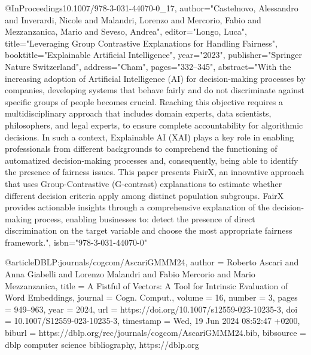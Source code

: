 {@InProceedings{10.1007/978-3-031-44070-0_17,
author="Castelnovo, Alessandro and Inverardi, Nicole and Malandri, Lorenzo and Mercorio, Fabio and Mezzanzanica, Mario and Seveso, Andrea",
editor="Longo, Luca",
title="Leveraging Group Contrastive Explanations for Handling Fairness",
booktitle="Explainable Artificial Intelligence",
year="2023",
publisher="Springer Nature Switzerland",
address="Cham",
pages="332--345",
abstract="With the increasing adoption of Artificial Intelligence (AI) for decision-making processes by companies, developing systems that behave fairly and do not discriminate against specific groups of people becomes crucial. Reaching this objective requires a multidisciplinary approach that includes domain experts, data scientists, philosophers, and legal experts, to ensure complete accountability for algorithmic decisions. In such a context, Explainable AI (XAI) plays a key role in enabling professionals from different backgrounds to comprehend the functioning of automatized decision-making processes and, consequently, being able to identify the presence of fairness issues. This paper presents FairX, an innovative approach that uses Group-Contrastive (G-contrast) explanations to estimate whether different decision criteria apply among distinct population subgroups. FairX provides actionable insights through a comprehensive explanation of the decision-making process, enabling businesses to: detect the presence of direct discrimination on the target variable and choose the most appropriate fairness framework.",
isbn="978-3-031-44070-0"
}


@article{DBLP:journals/cogcom/AscariGMMM24,
  author       = {Roberto Ascari and
                  Anna Giabelli and
                  Lorenzo Malandri and
                  Fabio Mercorio and
                  Mario Mezzanzanica},
  title        = {A Fistful of Vectors: {A} Tool for Intrinsic Evaluation of Word Embeddings},
  journal      = {Cogn. Comput.},
  volume       = {16},
  number       = {3},
  pages        = {949--963},
  year         = {2024},
  url          = {https://doi.org/10.1007/s12559-023-10235-3},
  doi          = {10.1007/S12559-023-10235-3},
  timestamp    = {Wed, 19 Jun 2024 08:52:47 +0200},
  biburl       = {https://dblp.org/rec/journals/cogcom/AscariGMMM24.bib},
  bibsource    = {dblp computer science bibliography, https://dblp.org}
}

}
